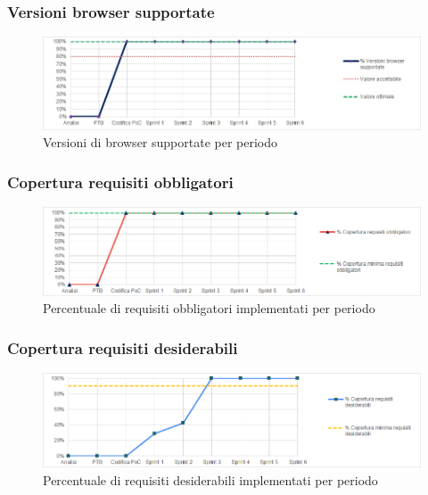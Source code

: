 \subsubsection{Versioni browser supportate}
\begin{figure}[H]
  \centering
  \includegraphics[scale=0.7]{immagini/browser.jpg}
  \caption{Versioni di browser supportate per periodo}
\end{figure}

\subsubsection{Copertura requisiti obbligatori}
\begin{figure}[H]
  \centering
  \includegraphics[scale=0.7]{immagini/cop_obbligatori.png}
  \caption{Percentuale di requisiti obbligatori implementati per periodo}
\end{figure}

\subsubsection{Copertura requisiti desiderabili}
\begin{figure}[H]
  \centering
  \includegraphics[scale=0.7]{immagini/cop_desiderabili.png}
  \caption{Percentuale di requisiti desiderabili implementati per periodo}
\end{figure}

